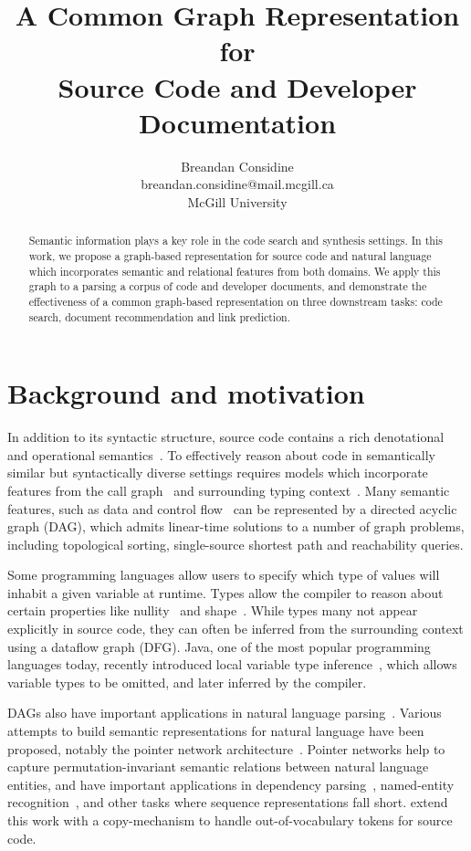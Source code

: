 \documentclass{article}
\title{A Common Graph Representation for\\Source Code and Developer Documentation}
\author{Breandan Considine\\
breandan.considine@mail.mcgill.ca\\
McGill University}
\begin{document}
\maketitle

\begin{abstract}
Semantic information plays a key role in the code search and synthesis settings. In this work, we propose a graph-based representation for source code and natural language which incorporates semantic and relational features from both domains. We apply this graph to a parsing a corpus of code and developer documents, and demonstrate the effectiveness of a common graph-based representation on three downstream tasks: code search, document recommendation and link prediction.
\end{abstract}

\section{Background and motivation}

In addition to its syntactic structure, source code contains a rich denotational and operational semantics~\citep{henkel2018code}. To effectively reason about code in semantically similar but syntactically diverse settings requires models which incorporate features from the call graph~\citep{gu2016deep} and surrounding typing context~\citep{allamanis2017learning}. Many semantic features, such as data and control flow~\citep{si2018learning} can be represented by a directed acyclic graph (DAG), which admits linear-time solutions to a number of graph problems, including topological sorting, single-source shortest path and reachability queries.

Some programming languages allow users to specify which type of values will inhabit a given variable at runtime. Types allow the compiler to reason about certain properties like nullity~\citep{ekman2007pluggable} and shape~\citep{considine2019kotlingrad}. While types many not appear explicitly in source code, they can often be inferred from the surrounding context using a dataflow graph (DFG). Java, one of the most popular programming languages today, recently introduced local variable type inference~\citet{liddell2019analyzing}, which allows variable types to be omitted, and later inferred by the compiler.

DAGs also have important applications in natural language parsing~\citep{sagae2008shift, quernheim2012dagger}. Various attempts to build semantic representations for natural language have been proposed, notably the pointer network architecture~\citep{vinyals2015pointer, vinyals2015order}. Pointer networks help to capture permutation-invariant semantic relations between natural language entities, and have important applications in dependency parsing~\citep{ma2018stack}, named-entity recognition~\citep{lample2016neural}, and other tasks where sequence representations fall short. \citet{li2017code} extend this work with a copy-mechanism to handle out-of-vocabulary tokens for source code.
\end{document}
